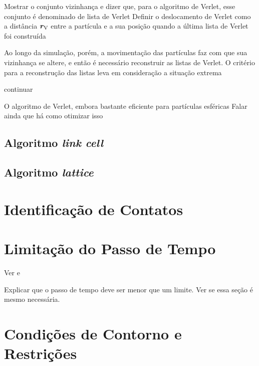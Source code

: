 \alert{Mostrar o conjunto vizinhança e dizer que, para o algoritmo de Verlet, esse conjunto é denominado de lista de Verlet}
\alert{Definir o deslocamento de Verlet como a distância \(\bm{r}_{\text{V}}\) entre a partícula e a sua posição quando a última lista de Verlet foi construída}


Ao longo da simulação, porém, a movimentação das partículas faz  com que sua vizinhança se altere, e então é necessário reconstruir as listas de Verlet. O critério para a reconstrução das listas leva em consideração a situação extrema

\alert{continuar}

O algoritmo de Verlet, embora bastante eficiente para partículas esféricas \alert{Falar ainda que há como otimizar isso}

\subsection{Algoritmo \textit{link cell}}
\subsection{Algoritmo \textit{lattice}}

\section{Identificação de Contatos}

\section{Limitação do Passo de Tempo}

\alert{Ver  e }

\alert{Explicar que o passo de tempo deve ser menor que um limite. Ver se essa seção é mesmo necessária.}

\section{Condições de Contorno e Restrições} \label{sec:boundary_condition}

